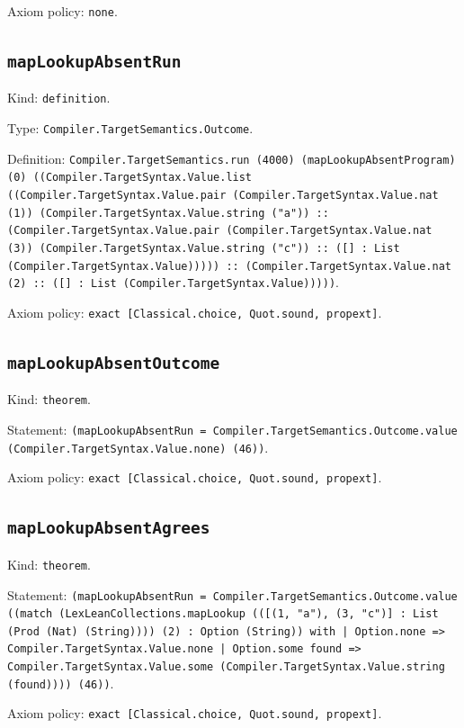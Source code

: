 \documentclass[11pt]{article}
\begin{document}
\noindent Axiom policy: \texttt{none}.\par
\subsection*{\texttt{mapLookupAbsentRun}}
\noindent Kind: \texttt{definition}.\par
\noindent Type: \texttt{Compiler.TargetSemantics.Outcome}.\par
\noindent Definition: \texttt{Compiler.TargetSemantics.run (4000) (mapLookupAbsentProgram) (0) ((Compiler.TargetSyntax.Value.list ((Compiler.TargetSyntax.Value.pair (Compiler.TargetSyntax.Value.nat (1)) (Compiler.TargetSyntax.Value.string ("a")) :: (Compiler.TargetSyntax.Value.pair (Compiler.TargetSyntax.Value.nat (3)) (Compiler.TargetSyntax.Value.string ("c")) :: ([] : List (Compiler.TargetSyntax.Value))))) :: (Compiler.TargetSyntax.Value.nat (2) :: ([] : List (Compiler.TargetSyntax.Value)))))}.\par
\noindent Axiom policy: \texttt{exact [Classical.choice, Quot.sound, propext]}.\par
\subsection*{\texttt{mapLookupAbsentOutcome}}
\noindent Kind: \texttt{theorem}.\par
\noindent Statement: \texttt{(mapLookupAbsentRun = Compiler.TargetSemantics.Outcome.value (Compiler.TargetSyntax.Value.none) (46))}.\par
\noindent Axiom policy: \texttt{exact [Classical.choice, Quot.sound, propext]}.\par
\subsection*{\texttt{mapLookupAbsentAgrees}}
\noindent Kind: \texttt{theorem}.\par
\noindent Statement: \texttt{(mapLookupAbsentRun = Compiler.TargetSemantics.Outcome.value ((match (LexLeanCollections.mapLookup (([(1, "a"), (3, "c")] : List (Prod (Nat) (String)))) (2) : Option (String)) with | Option.none => Compiler.TargetSyntax.Value.none | Option.some found => Compiler.TargetSyntax.Value.some (Compiler.TargetSyntax.Value.string (found)))) (46))}.\par
\noindent Axiom policy: \texttt{exact [Classical.choice, Quot.sound, propext]}.\par
\end{document}
